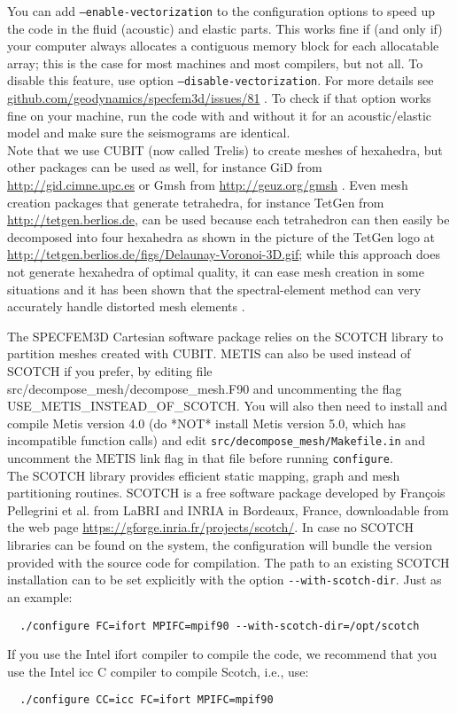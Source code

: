 You can add \texttt{--enable-vectorization} to the configuration options to speed up the code in the fluid (acoustic) and elastic parts.
This works fine if (and only if) your computer always allocates a contiguous memory block for each allocatable array;
this is the case for most machines and most compilers, but not all. To disable this feature, use option \texttt{--disable-vectorization}.
For more details see \href{https://github.com/geodynamics/specfem3d/issues/81}{github.com/geodynamics/specfem3d/issues/81} .
To check if that option works fine on your machine, run the code with and without it for an acoustic/elastic model and make sure the seismograms are identical.\\

Note that we use CUBIT (now called Trelis) to create meshes of hexahedra, but other packages
can be used as well, for instance GiD from \url{http://gid.cimne.upc.es}
or Gmsh from \url{http://geuz.org/gmsh} \citep{GeRe09}. Even mesh
creation packages that generate tetrahedra, for instance TetGen from
\url{http://tetgen.berlios.de}, can be used because each tetrahedron
can then easily be decomposed into four hexahedra as shown in the
picture of the TetGen logo at \url{http://tetgen.berlios.de/figs/Delaunay-Voronoi-3D.gif};
while this approach does not generate hexahedra of optimal quality,
it can ease mesh creation in some situations and it has been shown
that the spectral-element method can very accurately handle distorted
mesh elements \citep{OlSe11}.

The SPECFEM3D Cartesian software package relies on the SCOTCH library
to partition meshes created with CUBIT. METIS \citep{KaKu98a,KaKu98c,KaKu98b}
can also be used instead of SCOTCH if you prefer, by editing file
src/decompose\_mesh/decompose\_mesh.F90 and uncommenting the flag
USE\_METIS\_INSTEAD\_OF\_SCOTCH. You will also then need to install
and compile Metis version 4.0 (do {*}NOT{*} install Metis version
5.0, which has incompatible function calls) and edit \texttt{src/decompose\_mesh/Makefile.in}
and uncomment the METIS link flag in that file before running \texttt{configure}.\\


The SCOTCH library \citep{PeRo96} provides efficient static mapping,
graph and mesh partitioning routines. SCOTCH is a free software package
developed by Fran\c{c}ois Pellegrini et al. from LaBRI and INRIA in Bordeaux,
France, downloadable from the web page \url{https://gforge.inria.fr/projects/scotch/}.
In case no SCOTCH libraries can be found on the system, the configuration
will bundle the version provided with the source code for compilation.
The path to an existing SCOTCH installation can to be set explicitly
with the option \texttt{-{}-with-scotch-dir}. Just as an example:
\begin{verbatim}
  ./configure FC=ifort MPIFC=mpif90 --with-scotch-dir=/opt/scotch
\end{verbatim}
\noindent
If you use the Intel ifort compiler to compile the code, we recommend
that you use the Intel icc C compiler to compile Scotch, i.e., use:
\begin{verbatim}
  ./configure CC=icc FC=ifort MPIFC=mpif90
\end{verbatim}

